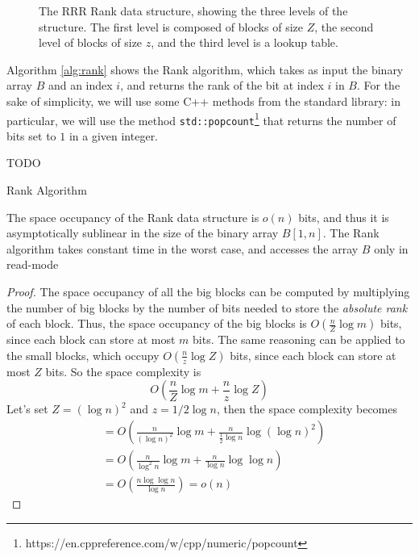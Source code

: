 \begin{figure}[h]
\begin{flushright}
    \end{flushright}
    \caption{The RRR Rank data structure, showing the three levels of the structure. The first level is composed of blocks of size $Z$, the second level of blocks of size $z$, and the third level is a lookup table.} \label{fig:RRR}
\end{figure}

\noindent Algorithm \ref{alg:rank} shows the Rank algorithm, which takes as input the binary array $B$ and an index $i$, and returns the rank of the bit at index $i$ in $B$. For the sake of simplicity, we will use some C++ methods from the standard library: in particular, we will use the method \texttt{std::popcount}\footnote{https://en.cppreference.com/w/cpp/numeric/popcount} that returns the number of bits set to $1$ in a given integer.

\begin{algorithm}
    \begin{algorithmic}[1]
        \State TODO
        \EndFunction
    \end{algorithmic}
    \caption{Rank Algorithm} \label{alg:rank}
\end{algorithm}

\begin{theorem} \label{th:rank}
    The space occupancy of the Rank data structure is $o(n)$ bits, and thus it is asymptotically sublinear in the size of the binary array $B[1, n]$. The Rank algorithm takes constant time in the worst case, and accesses the array $B$ only in read-mode
\end{theorem}
\begin{proof}
    The space occupancy of all the big blocks can be computed by multiplying the number of big blocks by the number of bits needed to store the \emph{absolute rank} of each block. Thus, the space occupancy of the big blocks is $O(\frac{n}{Z} \log m)$ bits, since each block can store at most $m$ bits. The same reasoning can be applied to the small blocks, which occupy $O(\frac{n}{z} \log Z)$ bits, since each block can store at most $Z$ bits. So the space complexity is
    \begin{equation}
        O\left(\frac{n}{Z} \log m + \frac{n}{z} \log Z\right)
    \end{equation}
    Let's set $Z = (\log n)^2$ and $z = 1/2 \log n$, then the space complexity becomes
    \begin{align}
         & = O\left(\frac{n}{(\log n)^2} \log m + \frac{n}{\frac{1}{2} \log n} \log (\log n)^2\right) \\
         & = O\left(\frac{n}{\log^2n} \log m + \frac{n}{\log n} \log \log n\right)                    \\
         & = O\left(\frac{n \log \log n}{\log n} \right)= o(n)
    \end{align}
\end{proof}

